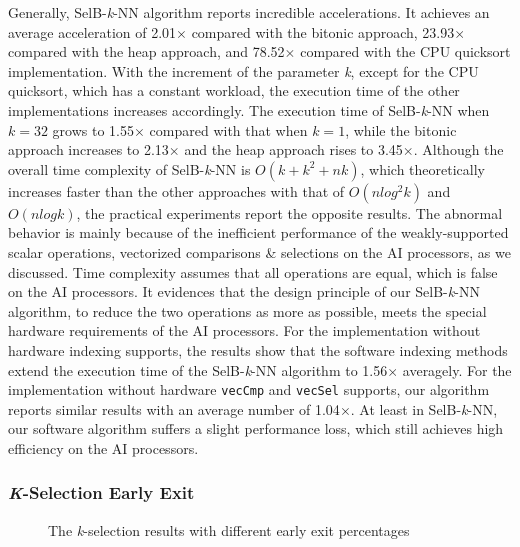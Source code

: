 Generally, SelB-\textit{k}-NN algorithm reports incredible accelerations. It achieves an average acceleration of 2.01$\times$ compared with the bitonic approach, 23.93$\times$ compared with the heap approach, and 78.52$\times$ compared with the CPU quicksort implementation. With the increment of the parameter \textit{k}, except for the CPU quicksort, which has a constant workload, the execution time of the other implementations increases accordingly. The execution time of SelB-\textit{k}-NN when $k = 32$ grows to 1.55$\times$ compared with that when $k = 1$, while the bitonic approach increases to 2.13$\times$ and the heap approach rises to 3.45$\times$. Although the overall time complexity of SelB-\textit{k}-NN is $O(k + k^2 + nk)$, which theoretically increases faster than the other approaches with that of $O(nlog^2k)$ and $O(nlogk)$, the practical experiments report the opposite results. The abnormal behavior is mainly because of the inefficient performance of the weakly-supported scalar operations, vectorized comparisons \& selections on the AI processors, as we discussed. Time complexity assumes that all operations are equal, which is false on the AI processors. It evidences that the design principle of our SelB-\textit{k}-NN algorithm, to reduce the two operations as more as possible, meets the special hardware requirements of the AI processors. For the implementation without hardware indexing supports, the results show that the software indexing methods extend the execution time of the SelB-\textit{k}-NN algorithm to 1.56$\times$ averagely. For the implementation without hardware \verb|vecCmp| and \verb|vecSel| supports, our algorithm reports similar results with an average number of 1.04$\times$. At least in SelB-\textit{k}-NN, our software algorithm suffers a slight performance loss, which still achieves high efficiency on the AI processors.

\subsubsection{\textit{K}-Selection Early Exit \label{early}}

\begin{figure}[tbp]
    \caption{The \textit{k}-selection results with different early exit percentages}
    \label{fig:early_exit}
    \end{figure}


